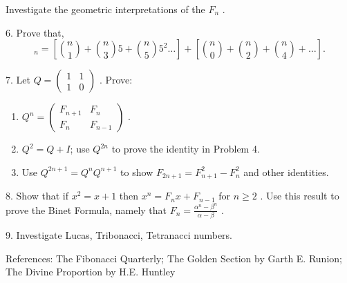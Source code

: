 \documentclass[10pt,]{book}
\theoremstyle{plain}
\theoremstyle{definition}
\theoremstyle{definition}
\theoremstyle{definition}
\numberwithin{equation}{chapter}
\newcommand{\amp}{&}
\begin{document}
\begin{exerciselist}
Investigate the geometric interpretations of the \(F_{n}\) .%
\par\smallskip
\item[6.]\hypertarget{exercise-23}{}\hypertarget{p-1692}{}%
Prove that,%
\begin{equation*}
_{n} = \left\lbrack \binom{n}{1}  + \binom{n}{3} 5 + \binom{n}{5} 5^{2}\ldots \right\rbrack + \left\lbrack \binom{n}{0}  + \binom{n}{2}  + \binom{n}{4}  + \ldots \right\rbrack.
\end{equation*}
%
\par\smallskip
\item[7.]\hypertarget{exercise-24}{}\hypertarget{p-1693}{}%
Let \(Q =\begin{pmatrix}1 \amp 1 \\ 1 \amp 0\end{pmatrix}\) . Prove: \leavevmode%
\begin{enumerate}[label=(\alph*)]
\item\hypertarget{li-90}{}\hypertarget{p-1694}{}%
\(Q^{n} = \begin{pmatrix} F_{n + 1} \amp F_{n}\\ F_{n} \amp F_{n - 1} \end{pmatrix}\) .%
\item\hypertarget{li-91}{}\hypertarget{p-1695}{}%
\(Q^{2} = Q + I\); use \(Q^{2n}\) to prove the identity in Problem 4.%
\item\hypertarget{li-92}{}\hypertarget{p-1696}{}%
Use \(Q^{2n + 1} = Q^{n}Q^{n + 1}\) to show \(F_{2n + 1} = F_{n + 1}^{2} - F_{n}^{2}\) and other identities.%
\end{enumerate}
%
\par\smallskip
\item[8.]\hypertarget{exercise-25}{}\hypertarget{p-1697}{}%
Show that if \(x^{2} = x + 1\) then \(x^{n} = F_{n}x + F_{n - 1}\) for \(n \geq 2\) . Use this result to prove the Binet Formula, namely that \(F_{n} = \frac{\alpha^{n} - \beta^{n}}{\alpha - \beta}\) .%
\par\smallskip
\item[9.]\hypertarget{exercise-26}{}\hypertarget{p-1698}{}%
Investigate Lucas, Tribonacci, Tetranacci numbers.%
\par\smallskip
\end{exerciselist}
\bigbreak
\hypertarget{p-1699}{}%
References: The Fibonacci Quarterly; The Golden Section by Garth E. Runion; The Divine Proportion by H.E. Huntley%
\typeout{************************************************}
\typeout{************************************************}
\end{document}
